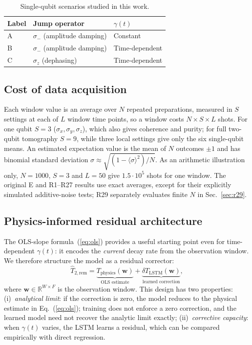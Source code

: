 \documentclass[twocolumn,10pt]{article}
\begin{document}
\begin{table}[h]
\centering
\caption{Single-qubit scenarios studied in this work.\label{tab:scenarios}}
\small
\begin{tabular}{lll}
\toprule
Label & Jump operator & $\gamma(t)$ \\
\midrule
A & $\sigma_-$ (amplitude damping) & Constant \\
B & $\sigma_-$ (amplitude damping) & Time-dependent \\
C & $\sigma_z$ (dephasing)         & Time-dependent \\
\bottomrule
\end{tabular}
\end{table}

\subsection{Cost of data acquisition}
\label{sec:cost}

Each window value is an average over $N$ repeated preparations, measured
in $S$ settings at each of $L$ window time points, so a window costs
$N\times S\times L$ shots. For one qubit $S=3$ ($\sigma_x,\sigma_y,\sigma_z$),
which also gives coherence and purity; for full two-qubit tomography
$S=9$, while three local settings give only the six single-qubit means.
An estimated expectation value is the mean of $N$ outcomes $\pm1$ and
has binomial standard deviation
$\sigma \approx \sqrt{(1-\langle\sigma\rangle^2)/N}$.
As an arithmetic illustration only, $N=1000$, $S=3$ and $L=50$ give
$1.5\cdot10^{5}$ shots for one window. The original E and R1--R27 results use exact
averages, except for their explicitly simulated additive-noise tests; R29
separately evaluates finite $N$ in Sec.~\ref{sec:r29}.

\subsection{Physics-informed residual architecture}

The OLS-slope formula~(\ref{eq:ols}) provides a useful starting point
even for time-dependent $\gamma(t)$: it encodes the \emph{current}
decay rate from the observation window.
We therefore structure the model as a residual corrector:
\begin{equation}
  \widehat{T}_{2,\text{rem}}
  = \underbrace{T_{\mathrm{physics}}(\mathbf{w})}_{\text{OLS estimate}}
  + \underbrace{\delta T_{\mathrm{LSTM}}(\mathbf{w})}_{\text{learned correction}},
  \label{eq:residual}
\end{equation}
where $\mathbf{w} \in \mathbb{R}^{W \times F}$ is the observation window.
This design has two properties:
(i)~\emph{analytical limit}: if the correction is zero, the model reduces
to the physical estimate in Eq.~(\ref{eq:ols}); training does not enforce a
zero correction, and the learned model need not recover the analytic limit
exactly; (ii)~\emph{corrective capacity}: when $\gamma(t)$ varies, the LSTM
learns a residual, which can be compared empirically with direct regression.
\end{document}

